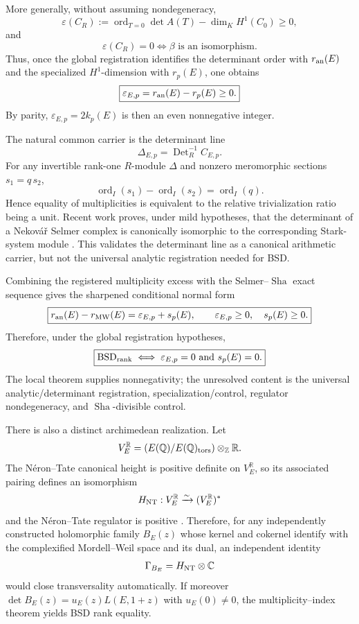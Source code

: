 \documentclass[11pt]{article}
\newcommand{\Sha}{\operatorname{Sha}}
\begin{document}
More generally, without assuming nondegeneracy,
\[
\boxed{
\varepsilon(C_R)
:=
\operatorname{ord}_{T=0}\det A(T)-\dim_KH^1(C_0)
\ge0,
}
\]
and
\[
\varepsilon(C_R)=0
\iff
\beta\text{ is an isomorphism}.
\]
Thus, once the global registration identifies the determinant order with \(r_{\rm an}(E)\) and the specialized \(H^1\)-dimension with \(r_p(E)\), one obtains
\[
\boxed{
\varepsilon_{E,p}=r_{\rm an}(E)-r_p(E)\ge0.
}
\]
By parity, \(\varepsilon_{E,p}=2k_p(E)\) is then an even nonnegative integer.

The natural common carrier is the determinant line
\[
\Delta_{E,p}=\operatorname{Det}^{-1}_R C_{E,p}.
\]
For any invertible rank-one \(R\)-module \(\Delta\) and nonzero meromorphic sections \(s_1=q\,s_2\),
\[
\boxed{
\operatorname{ord}_I(s_1)-\operatorname{ord}_I(s_2)=\operatorname{ord}_I(q).
}
\]
Hence equality of multiplicities is equivalent to the relative trivialization ratio being a unit. Recent work proves, under mild hypotheses, that the determinant of a Nekov\'a\v{r} Selmer complex is canonically isomorphic to the corresponding Stark-system module \cite{MaciasCastilloSano2026}. This validates the determinant line as a canonical arithmetic carrier, but not the universal analytic registration needed for BSD.

Combining the registered multiplicity excess with the Selmer--\(\Sha\) exact sequence gives the sharpened conditional normal form
\[
\boxed{
r_{\rm an}(E)-r_{\rm MW}(E)
=
\varepsilon_{E,p}+s_p(E),
\qquad
\varepsilon_{E,p}\ge0,\quad s_p(E)\ge0.
}
\]
Therefore, under the global registration hypotheses,
\[
\boxed{
\mathrm{BSD}_{\rm rank}
\iff
\varepsilon_{E,p}=0
\ \text{and}\
s_p(E)=0.
}
\]
The local theorem supplies nonnegativity; the unresolved content is the universal analytic/determinant registration, specialization/control, regulator nondegeneracy, and \(\Sha\)-divisible control.

There is also a distinct archimedean realization. Let
\[
V_E^{\mathbb R}=(E(\mathbb Q)/E(\mathbb Q)_{\rm tors})\otimes_{\mathbb Z}\mathbb R.
\]
The N\'eron--Tate canonical height is positive definite on \(V_E^{\mathbb R}\), so its associated pairing defines an isomorphism
\[
H_{\rm NT}:V_E^{\mathbb R}\xrightarrow{\sim}(V_E^{\mathbb R})^*
\]
and the N\'eron--Tate regulator is positive \cite{SilvermanAEC2009}. Therefore, for any independently constructed holomorphic family \(B_E(z)\) whose kernel and cokernel identify with the complexified Mordell--Weil space and its dual, an independent identity
\[
\Gamma_{B_E}=H_{\rm NT}\otimes\mathbb C
\]
would close transversality automatically. If moreover \(\det B_E(z)=u_E(z)L(E,1+z)\) with \(u_E(0)\neq0\), the multiplicity--index theorem yields BSD rank equality.
\end{document}
